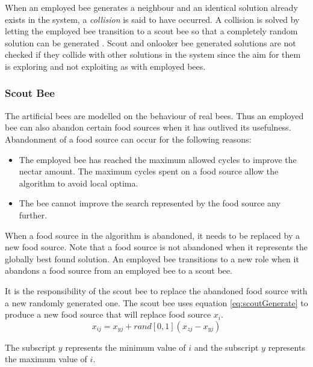 When an employed bee generates a neighbour and an identical solution already exists in the system, a \emph{collision} is said to have occurred. A collision is solved by letting the employed bee transition to a scout bee so that a completely random solution can be generated \cite{ABCLeafConstrained}. Scout and onlooker bee generated solutions are not checked if they collide with other solutions in the system since the aim for them is exploring and not exploiting as with employed bees\cite{BeeJobShop,ABCCompareStudy}. 
\subsubsection{Scout Bee}
The artificial bees are modelled on the behaviour of real bees. Thus an employed bee can also abandon certain food sources when it has outlived its usefulness. Abandonment of a food source can occur for the following reasons\cite{BeeJobShop,ABCNumericalOptimization,ABCImageEnhancement}:
\begin{itemize}
\item The employed bee has reached the maximum allowed cycles to improve the nectar amount. The maximum cycles spent on a food source allow the algorithm to avoid local optima\cite{ABCCompareStudy,ABCNumericalOptimization,ABCImageEnhancement}.
\item The bee cannot improve the search represented by the food source any further\cite{ABCCompareStudy,ABCNumericalOptimization,ABCImageEnhancement}.
\end{itemize}
When a food source in the algorithm is abandoned, it needs to be replaced by a new food source\cite{BeeJobShop,ABCCompareStudy,ABCImageEnhancement}. Note that a food source is not abandoned when it represents the globally best found solution. An employed bee transitions to a new role when it abandons a food source from an employed bee to a scout bee\cite{ABCCompareStudy,ABCNumericalOptimization,ABCImageEnhancement}. 

It is the responsibility of the scout bee to replace the abandoned food source with a new randomly generated one\cite{BeeJobShop,ABCCompareStudy,ABCImageEnhancement}. The scout bee uses equation \ref{eq:scoutGenerate} to produce a new food source that will replace food source $x_i$.
\begin{equation}
\label{eq:scoutGenerate}
x_{ij} = x_{yj} + rand[0,1](x_{zj} - x_{yj})
\end{equation}

The subscript $y$ represents the minimum value of $i$ and the subscript $y$ represents the maximum value of $i$.

